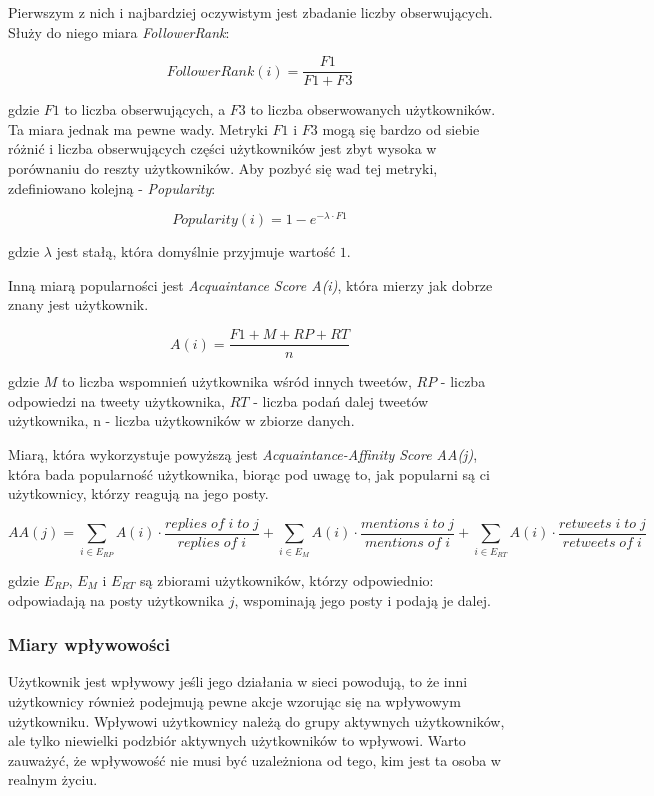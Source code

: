 \documentclass[polish,12pt]{aghthesis}
\begin{document}
Pierwszym z nich i najbardziej oczywistym jest zbadanie liczby obserwujących. Służy do niego miara \textit{FollowerRank}\cite{acTweetCountScore}:

\begin{equation}
   FollowerRank(i) = \frac{F1}{F1 + F3} \label{n2} 
\end{equation}

gdzie $F1$ to liczba obserwujących, a $F3$ to liczba obserwowanych użytkowników. Ta miara jednak ma pewne wady. Metryki $F1$ i $F3$ mogą się bardzo od siebie różnić i liczba obserwujących części użytkowników jest zbyt wysoka w porównaniu do reszty użytkowników. Aby pozbyć się wad tej metryki, zdefiniowano kolejną - \textit{Popularity}\cite{popularity}:

\begin{equation}
    Popularity(i) = 1 - e^{-\lambda \cdot F1} \label{n3}
\end{equation}

gdzie $\lambda$ jest stałą, która domyślnie przyjmuje wartość $1$.

Inną miarą popularności jest \textit{Acquaintance Score A(i)}, która mierzy jak dobrze znany jest użytkownik.

\begin{equation}
    A(i) = \frac{F1 + M + RP + RT}{n} \label{n4}
\end{equation}

gdzie $M$ to liczba wspomnień użytkownika wśród innych tweetów, $RP$ - liczba odpowiedzi na tweety użytkownika, $RT$ - liczba podań dalej tweetów użytkownika, n - liczba użytkowników w zbiorze danych.

Miarą, która wykorzystuje powyższą jest \textit{Acquaintance-Affinity Score AA(j)}, która bada popularność użytkownika, biorąc pod uwagę to, jak popularni są ci użytkownicy, którzy reagują na jego posty.

\begin{equation}
  AA(j) = \sum_{i \in E_{RP}} A(i) \cdot \frac{replies\; of\; i\; to\; j}{replies\; of\; i} + \sum_{i \in E_{M}} A(i) \cdot \frac{mentions\; i\; to\; j}{mentions\; of\; i} + \sum_{i \in E_{RT}} A(i) \cdot \frac{retweets\; i\; to\; j}{retweets\; of\; i} \label{n5}  
\end{equation}

gdzie $E_{RP}$, $E_{M}$ i $E_{RT}$ są zbiorami użytkowników, którzy odpowiednio: odpowiadają na posty użytkownika $j$, wspominają jego posty i podają je dalej.


\subsubsection{Miary wpływowości}
Użytkownik jest wpływowy jeśli jego działania w sieci powodują, to że inni użytkownicy również podejmują pewne akcje wzorując się na wpływowym użytkowniku. Wpływowi użytkownicy należą do grupy aktywnych użytkowników, ale tylko niewielki podzbiór aktywnych użytkowników to wpływowi. Warto zauważyć, że wpływowość nie musi być uzależniona od tego, kim jest ta osoba w realnym życiu. 
\end{document}
